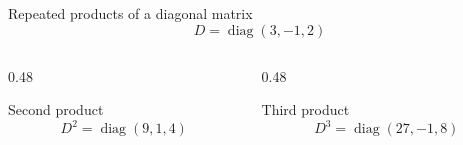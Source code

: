 \begin{frame}{Repeated products of a diagonal matrix}
  \[
  D=\operatorname{diag}(3,-1,2)
  \]
  \begin{columns}[T,onlytextwidth]
    \begin{column}{0.48\textwidth}
      \begin{block}{Second product}
        \[
        D^2=\operatorname{diag}(9,1,4)
        \]
      \end{block}
    \end{column}
    \begin{column}{0.48\textwidth}
      \begin{exampleblock}{Third product}
        \[
        D^3=\operatorname{diag}(27,-1,8)
        \]
      \end{exampleblock}
    \end{column}
  \end{columns}
  \vspace{0.45cm}
\end{frame}
